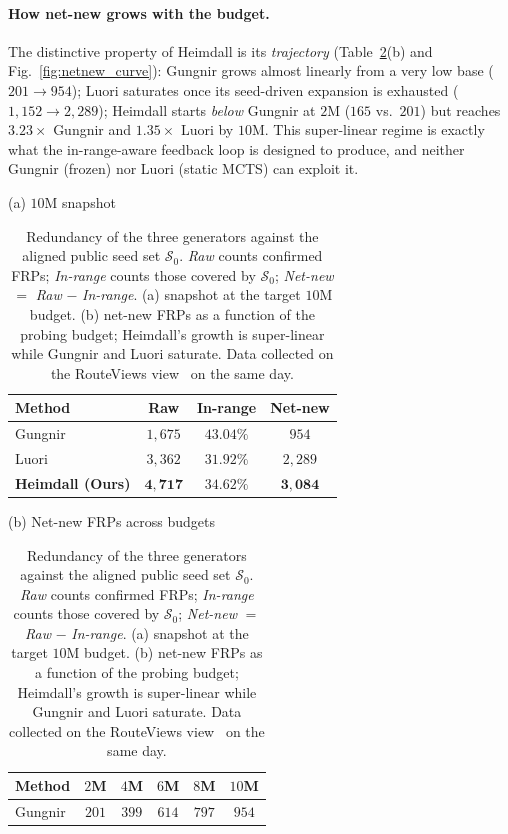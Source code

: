 \documentclass[conference]{IEEEtran}
\begin{document}
\paragraph{How net-new grows with the budget.}  The distinctive
property of Heimdall is its \emph{trajectory}
(Table~\ref{tab:redundancy}(b) and Fig.~\ref{fig:netnew_curve}):
Gungnir grows almost linearly from a very low base
($201\!\to\!954$); Luori saturates once its seed-driven expansion
is exhausted ($1{,}152\!\to\!2{,}289$); Heimdall starts
\emph{below} Gungnir at $2$M ($165$ vs.\ $201$) but reaches
$3.23\times$ Gungnir and $1.35\times$ Luori by $10$M.  This
super-linear regime is exactly what the in-range-aware feedback
loop is designed to produce, and neither Gungnir (frozen) nor
Luori (static MCTS) can exploit it.

\begin{table}[t]
\centering
\caption{Redundancy of the three generators against the aligned
public seed set $\mathcal{S}_{0}$.  \emph{Raw} counts confirmed
FRPs; \emph{In-range} counts those covered by $\mathcal{S}_{0}$;
\emph{Net-new} $=$ \emph{Raw} $-$ \emph{In-range}.  (a) snapshot
at the target $10$M budget.  (b) net-new FRPs as a function of
the probing budget; Heimdall's growth is super-linear while Gungnir
and Luori saturate.  Data collected on the RouteViews
view~\cite{routeviews} on the same day.}
\label{tab:redundancy}
\vspace{2pt}
\small
\begin{minipage}{0.44\linewidth}
\centering
(a) $10$M snapshot\\[2pt]
\begin{tabular}{lccc}
\toprule
Method & Raw & In-range & \textbf{Net-new}\\
\midrule
Gungnir~\cite{wei2025gungnir} & $1{,}675$ & $43.04\%$ & $954$\\
Luori~\cite{cheng2024luori}   & $3{,}362$ & $31.92\%$ & $2{,}289$\\
\textbf{Heimdall (Ours)}          & $\mathbf{4{,}717}$ & $\mathbf{34.62\%}$ & $\mathbf{3{,}084}$\\
\bottomrule
\end{tabular}
\end{minipage}
\hfill
\begin{minipage}{0.54\linewidth}
\centering
(b) Net-new FRPs across budgets\\[2pt]
\begin{tabular}{lccccc}
\toprule
Method & $2$M & $4$M & $6$M & $8$M & $10$M\\
\midrule
Gungnir & $201$ & $399$ & $614$ & $797$ & $954$\\

\end{tabular}
\end{minipage}
\end{table}
\end{document}
